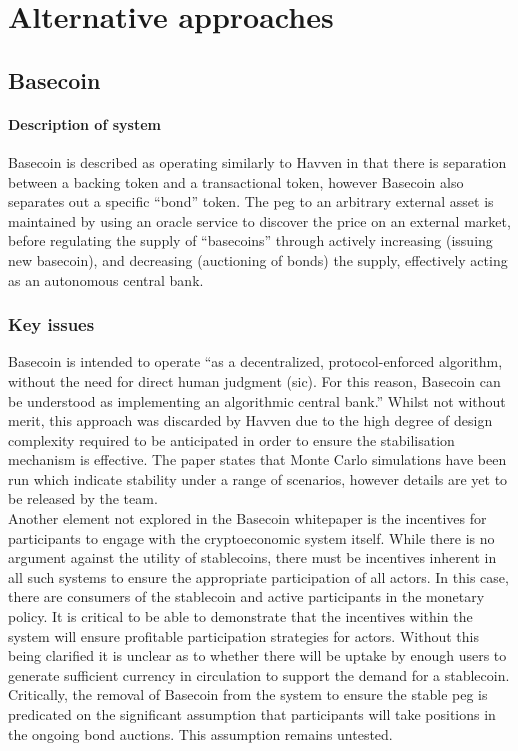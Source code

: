 \section{Alternative approaches}

\subsection{Basecoin}

\paragraph{Description of system}

\noindent Basecoin is described as operating similarly to Havven in that there is separation between a backing token and a transactional token, however Basecoin also separates out a specific ``bond'' token.
The peg to an arbitrary external asset is maintained by using an oracle service to discover the price on an external market, before regulating the supply of ``basecoins'' through actively increasing (issuing new basecoin),
and decreasing (auctioning of bonds) the supply, effectively acting as an autonomous central bank.

\subsubsection{Key issues}

\noindent Basecoin is intended to operate ``as a decentralized, protocol-enforced algorithm, without the need for direct human judgment (sic). For this reason,
Basecoin can be understood as implementing an algorithmic central bank.'' Whilst not without merit, this approach was discarded by Havven due to the high degree
of design complexity required to be anticipated in order to ensure the stabilisation mechanism is effective. The paper states that Monte Carlo simulations have
been run which indicate stability under a range of scenarios, however details are yet to be released by the team. \\

\noindent Another element not explored in the Basecoin whitepaper is the incentives for participants to engage with the cryptoeconomic system itself.
While there is no argument against the utility of stablecoins, there must be incentives inherent in all such systems to ensure the appropriate
participation of all actors. In this case, there are consumers of the stablecoin and active participants in the monetary policy. It is critical
to be able to demonstrate that the incentives within the system will ensure profitable participation strategies for actors. Without this being clarified
it is unclear as to whether there will be uptake by enough users to generate sufficient currency in circulation to support the demand for a stablecoin.
Critically, the removal of Basecoin from the system to ensure the stable peg is predicated on the significant assumption that participants will take positions
in the ongoing bond auctions. This assumption remains untested. \\

